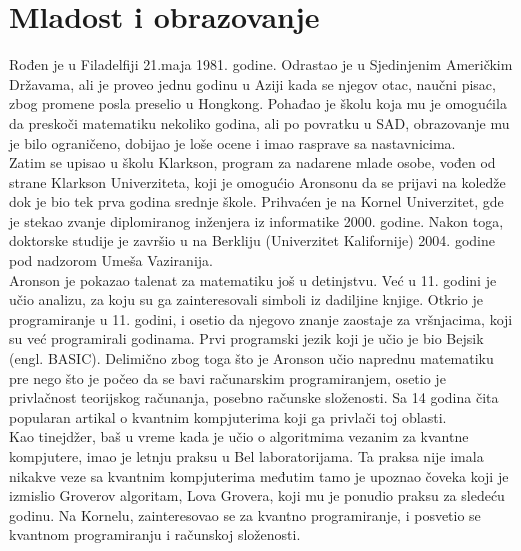 \documentclass[a4paper]{article}
\begin{document}
{\section{Mladost i obrazovanje}
Rođen je u Filadelfiji 21.maja 1981. godine. Odrastao je u Sjedinjenim Američkim Državama, 
ali je proveo jednu godinu u Aziji kada se njegov otac, naučni pisac, 
zbog promene posla preselio u Hongkong. \cite{thecomplexonaut} Pohađao je školu koja mu je omogućila da preskoči 
matematiku nekoliko godina, ali po povratku u SAD, obrazovanje mu je bilo ograničeno, dobijao je loše ocene i imao rasprave sa nastavnicima. 
\\[1\baselineskip]
Zatim se upisao u školu Klarkson, program za nadarene mlade osobe, vođen od strane Klarkson Univerziteta, koji je omogućio 
Aronsonu da se prijavi na koledže dok je bio tek prva godina srednje škole. Prihvaćen je na Kornel Univerzitet, gde je stekao zvanje diplomiranog inženjera iz informatike 2000. godine. 
Nakon toga, doktorske studije je završio u na Berkliju (Univerzitet Kalifornije) 2004. godine pod nadzorom Umeša Vaziranija.
\\[1\baselineskip]
Aronson je pokazao talenat za matematiku još u detinjstvu. Već u 11. godini je učio analizu, za koju su ga zainteresovali simboli iz dadiljine knjige. \cite{thecomplexonaut} 
Otkrio je programiranje u 11. godini, i osetio da njegovo znanje zaostaje za vršnjacima, koji su već programirali godinama. 
Prvi programski jezik koji je učio je bio Bejsik (engl. BASIC). Delimično zbog toga što je Aronson učio naprednu matematiku pre 
nego što je počeo da se bavi računarskim programiranjem, osetio je privlačnost teorijskog računanja, posebno računske složenosti. 
Sa 14 godina čita popularan artikal o kvantnim kompjuterima koji ga privlači toj oblasti. 
\\[1\baselineskip]
Kao tinejdžer, baš u vreme kada je učio o algoritmima vezanim za kvantne kompjutere, 
imao je letnju praksu u Bel laboratorijama. Ta praksa nije imala nikakve veze sa kvantnim kompjuterima međutim tamo je upoznao čoveka koji je izmislio Groverov algoritam, 
Lova Grovera, koji mu je ponudio praksu za sledeću godinu. \cite{praksa} Na Kornelu, zainteresovao se za kvantno programiranje, i posvetio se kvantnom programiranju i računskoj složenosti.
}
\end{document}
